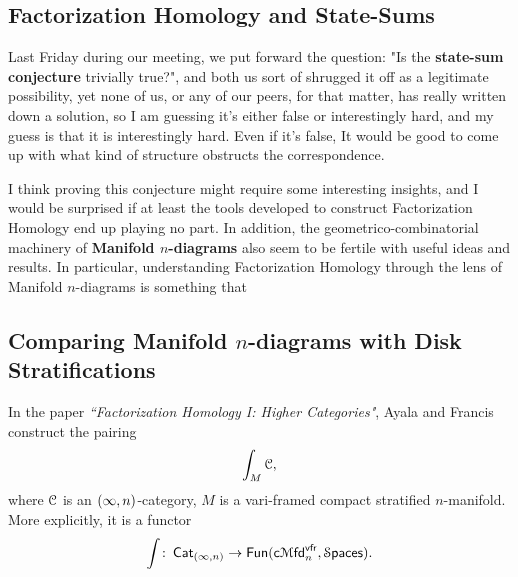 \subsection{Factorization Homology and State-Sums}

Last Friday during our meeting, we put forward the question: "Is the \textbf{state-sum conjecture} trivially true?", and both us sort of shrugged it off as a legitimate possibility, yet none of us, or any of our peers, for that matter, has really written down a solution, so I am guessing it's either false or interestingly hard, and my guess is that it is interestingly hard. Even if it's false, It would be good to come up with what kind of structure obstructs the correspondence.  

I think proving this conjecture might require some interesting insights, and I would be surprised if at least the tools developed to construct Factorization Homology end up playing no part. In addition, the geometrico-combinatorial machinery of \textbf{Manifold $n$-diagrams} also seem to be fertile with useful ideas and results. In particular, understanding Factorization Homology through the lens of Manifold $n$-diagrams is something that 


\subsection{Comparing Manifold $n$-diagrams with Disk Stratifications}
In the paper \textit{``Factorization Homology I: Higher Categories"}, Ayala and Francis construct the pairing \[\int_{M}\mathcal C,\] where $\mathcal C$ is an $(\operatorname{\infty},n)$-category, $M$ is a vari-framed compact stratified $n$-manifold. More explicitly, it is a functor 
\[\int\colon \operatorname{{\sf Cat}}_{(\operatorname{\infty},n)}\rightarrow \operatorname{\sf Fun}(\operatorname{{\sf c}{\mathcal M}\mathsf{fd}}_n^{\operatorname{\sf vfr}},\operatorname{\mathcal S\mathsf{paces}}).\]


